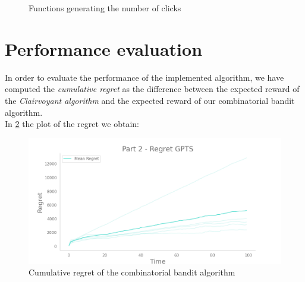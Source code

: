 \begin{figure}[!htb]
	\caption{Functions generating the number of clicks}
	\label{curve2Fig}
\end{figure}



\section{Performance evaluation}
In order to evaluate the performance of the implemented algorithm, we have computed the \emph{cumulative regret} as the difference between the expected reward of the \textit{Clairvoyant algorithm} and the expected reward of our combinatorial bandit algorithm.\\
In \ref{regret2Fig} the plot of the regret we obtain:
\begin{figure}[!htb]
	\centering
		\includegraphics[width=\textwidth]{images/part2.png}
	\caption{Cumulative regret of the combinatorial bandit algorithm}
	\label{regret2Fig}
\end{figure}


